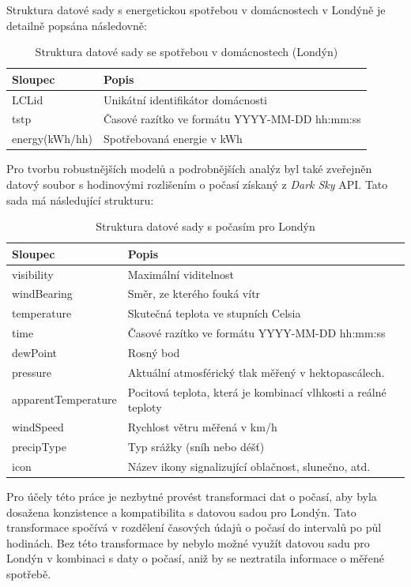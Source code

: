 \documentclass[FM,BP,fonts]{tulthesis}
\begin{document}
Struktura datové sady s energetickou spotřebou v domácnostech v Londýně je detailně popsána následovně:
 \renewcommand{\arraystretch}{1.1}
\begin{table}[!ht]
	\centering
	\caption{Struktura datové sady se spotřebou v domácnostech (Londýn)}
	\begin{tabularx}{\linewidth}{ll}
		\hline
		\textbf{Sloupec} & \textbf{Popis} \\ \hline
		LCLid & Unikátní identifikátor domácnosti \\ 
		tstp & Časové razítko ve formátu YYYY-MM-DD hh:mm:ss \\ 
		energy(kWh/hh) & Spotřebovaná energie v kWh \\ 
		\hline
	\end{tabularx}
\end{table}

Pro tvorbu robustnějších modelů a podrobnějších analýz byl také zveřejněn datový soubor s hodinovými rozlišením o počasí získaný z \textit{Dark Sky} API. Tato sada má následující strukturu:


\begin{table}[!ht]
	\centering
	\caption{Struktura datové sady s počasím pro Londýn}
	\label{weather_dataset}
	\begin{tabularx}{\linewidth}{lX}
		\hline
		\textbf{Sloupec} & \textbf{Popis} \\ \hline
		visibility & Maximální viditelnost \\ 
		windBearing & Směr, ze kterého fouká vítr \\ 
		temperature & Skutečná teplota ve stupních Celsia \\ 
		time & Časové razítko ve formátu YYYY-MM-DD hh:mm:ss	 \\ 
		dewPoint & Rosný bod \\ 
		pressure & Aktuální atmosférický tlak měřený v hektopascálech. \\ 
		apparentTemperature & Pocitová teplota, která je kombinací vlhkosti a reálné teploty \\ 
		windSpeed & Rychlost větru měřená v km/h \\ 
		precipType & Typ srážky (sníh nebo déšť) \\
		icon & Název ikony signalizující oblačnost, slunečno, atd.  \\ 
		\hline
	\end{tabularx}
\end{table}


Pro účely této práce je nezbytné provést transformaci dat o počasí, aby byla dosažena konzistence a kompatibilita s datovou sadou pro Londýn. Tato transformace spočívá v rozdělení časových údajů o počasí do intervalů po půl hodinách. Bez této transformace by nebylo možné využít datovou sadu pro Londýn v kombinaci s daty o počasí, aniž by se neztratila informace o měřené spotřebě.
\end{document}
